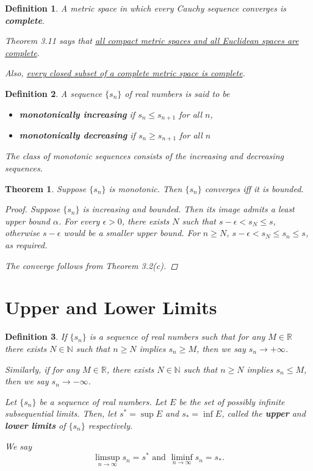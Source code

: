\documentclass{scrbook}
\newcommand{\N}{\mathbb{N}}
\newcommand{\R}{\mathbb{R}}
\renewcommand{\to}{\rightarrow}
\renewcommand{\underline}{\ul}
\newtheorem{theorem}{Theorem}
\newtheorem{definition}{Definition}
\begin{document}
\begin{definition} %
A metric space in which every Cauchy sequence converges is \textbf{complete}. 

Theorem 3.11 says that \underline{all compact metric spaces and all Euclidean spaces are complete}. 

Also, \underline{every closed subset of a complete metric space is complete}.
\end{definition}

\begin{definition} %
A sequence $\{s_n\}$ of real numbers is said to be
\begin{itemize}
\item \textbf{monotonically increasing} if $s_n \le s_{n+1}$ for all $n$,
\item \textbf{monotonically decreasing} if $s_n \ge s_{n+1}$ for all $n$
\end{itemize}

The class of monotonic sequences consists of the increasing and decreasing sequences.
\end{definition}

\begin{theorem} %
Suppose $\{s_n\}$ is monotonic. Then $\{s_n\}$ converges iff it is bounded.

\begin{proof}
Suppose $\{s_n\}$ is increasing and bounded. Then its image admits a least upper bound $\alpha$. For every $\epsilon > 0$, there exists $N$ such that $s - \epsilon < s_N \le s$, otherwise $s - \epsilon$ would be a smaller upper bound. For $n \ge N$, $s - \epsilon < s_N \le s_n \le s$, as required.

The converge follows from Theorem 3.2(c).
\end{proof}
\end{theorem}

\section{Upper and Lower Limits}

\begin{definition} %
If $\{s_n\}$ is a sequence of real numbers such that for any $M \in \R$ there exists $N \in \N$ such that $n \ge N$ implies $s_n \ge M$, then we say $s_n \to +\infty$. 

Similarly, if for any $M \in \R$, there exists $N \in \N$ such that $n \ge N$ implies $s_n \le M$, then we say $s_n \to -\infty$. 

Let $\{s_n\}$ be a sequence of real numbers. Let $E$ be the set of possibly infinite subsequential limits. Then, let $s^* = \sup E$ and $s_* = \inf E$, called the \textbf{upper} and \textbf{lower limits} of $\{s_n\}$ respectively. 

We say
\[
	\limsup_{n \to \infty} s_n = s^* \text{ and } \liminf_{n \to \infty} s_n = s_*.
\]
\end{definition}
\end{document}

